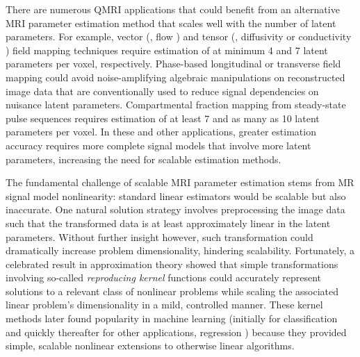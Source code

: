 There are numerous QMRI applications
that could benefit from an alternative MRI parameter estimation method
that scales well with the number of latent parameters.
For example,
vector (\eg, flow \cite{feinberg:85:mri})
and tensor 
(\eg, diffusivity \cite{bihan:01:dti} or conductivity \cite{tuch:01:ctm})
field mapping techniques
require estimation 
of at minimum 4 and 7 latent parameters per voxel,
respectively.
Phase-based longitudinal \cite{sekihara:85:nif} 
or transverse \cite{morrell:08:aps,sacolick:10:bmb} field mapping
could avoid noise-amplifying algebraic manipulations
on reconstructed image data
that are conventionally used
to reduce signal dependencies 
on nuisance latent parameters.
Compartmental fraction mapping \cite{mackay:94:ivv}
from steady-state pulse sequences
requires estimation of at least 7 \cite{deoni:08:gmt}
and as many as 10 \cite{deoni:13:oct}
latent parameters per voxel.
In these and other applications,
greater estimation accuracy
requires more complete signal models
that involve more latent parameters,
increasing the need 
for scalable estimation methods.


The fundamental challenge 
of scalable MRI parameter estimation
stems from MR signal model nonlinearity:
standard linear estimators
would be scalable but also inaccurate.
One natural solution strategy
involves preprocessing the image data
such that the transformed data 
is at least approximately linear
in the latent parameters.
Without further insight however,
such transformation 
could dramatically increase problem dimensionality,
hindering scalability.
Fortunately, 
a celebrated result
in approximation theory \cite{kimeldorf:70:acb} showed
that simple transformations involving
so-called \emph{reproducing kernel} functions \cite{aronszajn:50:tor}
could accurately represent solutions 
to a relevant class of nonlinear problems
while scaling the associated linear problem's dimensionality 
in a mild, controlled manner.
These kernel methods later found popularity
in machine learning
(initially for classification \cite{cortes:95:svn}
and quickly thereafter for other applications,
\eg regression \cite{saunders:98:rrl})
because they provided simple, scalable nonlinear extensions
to otherwise linear algorithms.

